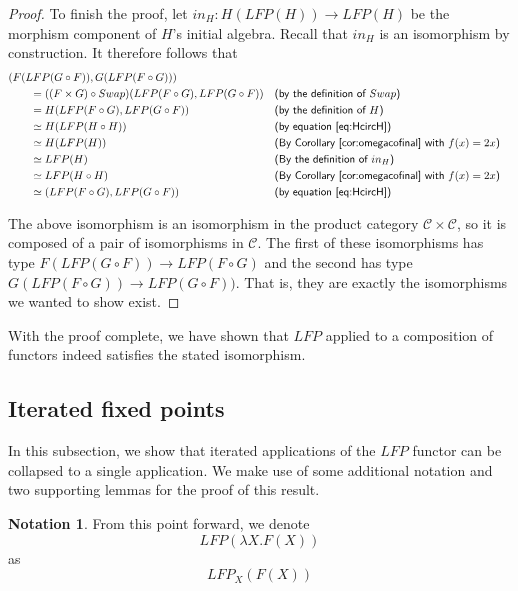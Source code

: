 \documentclass{msthesis}
\theoremstyle{definition}
\newtheorem*{notation}{Notation}
\newcommand{\mcC}{\mathcal{C}}
\begin{document}
\begin{proof}
    To finish the proof, let $in_H : H(LFP(H)) \to LFP(H)$ be the morphism component of $H$'s initial algebra.  Recall that $in_H$ is an isomorphism by construction.  It therefore follows that
        \begin{align*}
        &(F(LFP(G \circ F)), G(LFP(F \circ G)))\\
        &\qquad= ((F \times G) \circ Swap)(LFP(F \circ G), LFP(G \circ F)) && \textsf{(by the definition of $Swap$)} \\
        &\qquad= H(LFP(F \circ G), LFP(G \circ F)) && \textsf{(by the definition of $H$)} \\
          &\qquad\simeq H(LFP(H \circ H))         && \textsf{(by equation \eqref{eq:HcircH})} \\
          &\qquad\simeq H(LFP(H))            && \textsf{(By Corollary \ref{cor:omegacofinal} with $f(x) = 2x$)} \\
          &\qquad\simeq LFP(H) && \textsf{(By the definition of $in_H$)} \\
          &\qquad\simeq LFP(H \circ H) && \textsf{(By Corollary \ref{cor:omegacofinal} with $f(x) = 2x$)} \\
          &\qquad\simeq (LFP(F \circ G), LFP(G \circ F))  && \textsf{(by equation \eqref{eq:HcircH})}
        \end{align*}

       The above isomorphism is an isomorphism in the product category $\mcC \times \mcC$, so it is composed of a pair of isomorphisms in $\mcC$.  The first of these isomorphisms has type $F(LFP(G \circ F)) \to LFP(F \circ G)$ and the second has type $G(LFP(F \circ G)) \to LFP(G \circ F))$.  That is, they are exactly the isomorphisms we wanted to show exist.
\end{proof}

With the proof complete, we have shown that $LFP$ applied to a composition of functors indeed satisfies the stated isomorphism.

\subsection{Iterated fixed points}

In this subsection, we show that iterated applications of the $LFP$ functor can be collapsed to a single application.  We make use of some additional notation and two supporting lemmas for the proof of this result.

\begin{notation}
    From this point forward, we denote
    \[ LFP(\lambda X.F(X))\]
    as 
    \[ LFP_X(F(X)) \]
\end{notation}
\end{document}
